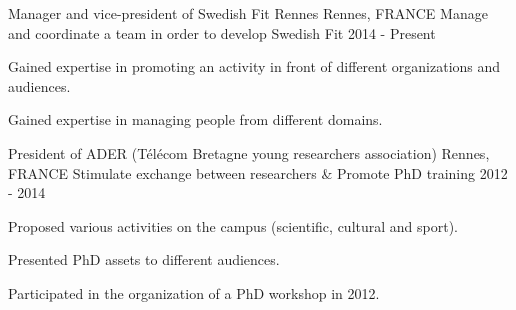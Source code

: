 \begin{cventries}
  \cventry
    {Manager and vice-president of Swedish Fit Rennes}
    {Rennes, FRANCE}
    {Manage and coordinate a team in order to develop Swedish Fit}
    {2014 - Present}
    {
      \begin{cvitems}
        \item {Gained expertise in promoting an activity in front of different organizations and audiences.}
        \item {Gained expertise in managing people from different domains.}
      \end{cvitems}
    }
  \cventry
    {President of ADER (T\'{e}l\'{e}com Bretagne young researchers association)}
    {Rennes, FRANCE}
    {Stimulate exchange between researchers \& Promote PhD training}
    {2012 - 2014}
    {
      \begin{cvitems}
        \item {Proposed various activities on the campus (scientific, cultural and sport).}
        \item {Presented PhD assets to different audiences.}
        \item {Participated in the organization of a PhD workshop in 2012.}
      \end{cvitems}
    }

\end{cventries}

